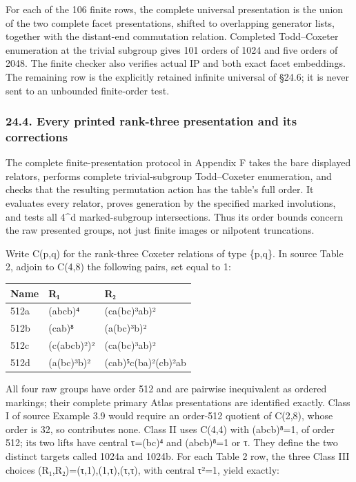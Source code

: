 \documentclass[
  10pt,
  letterpaper,
]{article}
\newcounter{none} %
\begin{document}
For each of the 106 finite rows, the complete universal presentation is
the union of the two complete facet presentations, shifted to
overlapping generator lists, together with the distant-end commutation
relation. Completed Todd--Coxeter enumeration at the trivial subgroup
gives 101 orders of 1024 and five orders of 2048. The finite checker
also verifies actual IP and both exact facet embeddings. The remaining
row is the explicitly retained infinite universal of §24.6; it is never
sent to an unbounded finite-order test.

\subsubsection{24.4. Every printed rank-three presentation and its
corrections}\label{every-printed-rank-three-presentation-and-its-corrections}

The complete finite-presentation protocol in Appendix F takes the bare
displayed relators, performs complete trivial-subgroup Todd--Coxeter
enumeration, and checks that the resulting permutation action has the
table's full order. It evaluates every relator, proves generation by the
specified marked involutions, and tests all 4\^{}d marked-subgroup
intersections. Thus its order bounds concern the raw presented groups,
not just finite images or nilpotent truncations.

Write C(p,q) for the rank-three Coxeter relations of type \{p,q\}. In
source Table 2, adjoin to C(4,8) the following pairs, set equal to 1:

{\def\LTcaptype{none} %
\begin{longtable}[]{@{}lll@{}}
\toprule\noalign{}
Name & R₁ & R₂ \\
\midrule\noalign{}
\endhead
\bottomrule\noalign{}
\endlastfoot
512a & (abcb)⁴ & (ca(bc)³ab)² \\
512b & (cab)⁸ & (a(bc)³b)² \\
512c & (c(abcb)²)² & (ca(bc)³ab)² \\
512d & (a(bc)³b)² & (cab)⁵c(ba)²(cb)²ab \\
\end{longtable}
}

All four raw groups have order 512 and are pairwise inequivalent as
ordered markings; their complete primary Atlas presentations are
identified exactly. Class I of source Example 3.9 would require an
order-512 quotient of C(2,8), whose order is 32, so contributes none.
Class II uses C(4,4) with (abcb)⁸=1, of order 512; its two lifts have
central τ=(bc)⁴ and (abcb)⁸=1 or τ. They define the two distinct targets
called 1024a and 1024b. For each Table 2 row, the three Class III
choices (R₁,R₂)=(τ,1),(1,τ),(τ,τ), with central τ²=1, yield exactly:
\end{document}
